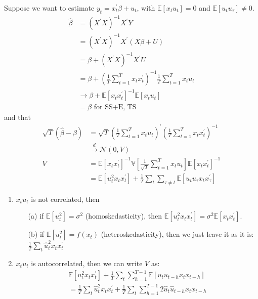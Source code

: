 Suppose we want to estimate $y_t = x_t^{\prime} \beta + u_t$, with $\mathbb{E}[x_t u_t] = 0$ and $\mathbb{E}[u_t u_{\tau}] \neq 0$.
\begin{align*}
    \hat{\beta} &= (X^{\prime} X)^{-1} X^{\prime} Y \\
    &= (X^{\prime} X)^{-1} X^{\prime} (X \beta + U) \\
    &= \beta + (X^{\prime} X)^{-1} X^{\prime} U \\
    &= \beta + \left( \frac{1}{T} \sum_{t=1}^{T} x_t x_t^{\prime} \right)^{-1} \frac{1}{T} \sum_{t=1}^{T} x_t u_t \\
    & \rightarrow \beta + \mathbb{E}[x_t x_t^{\prime}]^{-1} \mathbb{E}[x_t u_t] \\
    &= \beta \text{ for SS+E, TS}
\end{align*}
and that
\begin{align*}
    \sqrt{T}(\hat{\beta} - \beta) &= \sqrt{T} \left( \frac{1}{T} \sum_{t=1}^{T} x_t u_t \right)^{\prime} \left( \frac{1}{T} \sum_{t=1}^{T} x_t x_t^{\prime} \right)^{-1} \\
    &\overset{d}{\rightarrow} \mathcal{N}\left(0, V\right) \\
    V &= \mathbb{E}[x_t x_t^{\prime}]^{-1} \mathbb{V}\left[\frac{1}{\sqrt{T}} \sum_{t=1}^{T} x_t u_t\right] \mathbb{E}[x_t x_t^{\prime}]^{-1} \\
    &= \mathbb{E}[u_t^2 x_t x_t^{\prime}] + \frac{1}{T} \sum_{t} \sum_{\tau \neq t} \mathbb{E}[u_t u_{\tau} x_t x_{\tau}^{\prime}]
\end{align*}
\begin{enumerate}
    \item $x_t u_t$ is not correlated, then
        \begin{enumerate}
            \item[(a)] if $\mathbb{E}[u_t^2] = \sigma^2$ (homoskedasticity), then $\mathbb{E}[u_t^2 x_t x_t^{\prime}] = \sigma^2 \mathbb{E}[x_t x_t^{\prime}].$
            \item[(b)] if $\mathbb{E}[u_t^2] = f(x_t)$ (heteroskedasticity), then we just leave it as it is: $\frac{1}{T} \sum_{t} \hat{u}_t^2 x_t x_t^{\prime} $
        \end{enumerate}
    \item $x_t u_t$ is autocorrelated, then we can write $V$ as:
        \begin{gather*}
            \mathbb{E}[u_t^2 x_t x_t^{\prime}] + \frac{1}{T} \sum_{t} \sum_{h=1}^{T-1} \mathbb{E}[u_t u_{t-h} x_t x_{t-h}] \\
            = \frac{1}{T} \sum_{t} \hat{u}_t^2 x_t x_t^{\prime} + \frac{1}{T} \sum_{t} \sum_{h=1}^{T-1} 2 \hat{u}_t \hat{u}_{t-h} x_t x_{t-h}  
        \end{gather*}
\end{enumerate}
